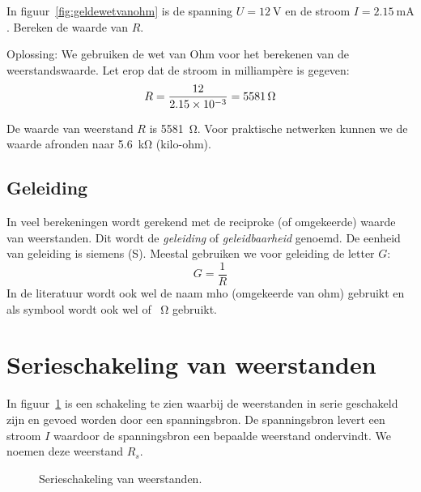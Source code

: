 \begin{example}
In figuur~\ref{fig:geldewetvanohm} is de spanning $U=\SI{12}{\volt}$ en de stroom $I=\SI{2.15}{\milli\ampere}$.
Bereken de waarde van $R$.

Oplossing: We gebruiken de wet van Ohm voor het berekenen van de weerstandswaarde. Let erop dat de stroom in milliampère is gegeven:
\begin{equation}
R = \dfrac{12}{\num{2.15d-3}} = \SI{5581}{\ohm} 
\end{equation}

De waarde van weerstand $R$ is \SI{5581}{\ohm}. Voor praktische netwerken kunnen we de waarde afronden
naar \SI{5.6}{\kilo\ohm} (kilo-ohm).
\end{example}

\subsection{Geleiding}
In veel berekeningen wordt gerekend met de reciproke (of omgekeerde) waarde van weerstanden. Dit wordt
de \textsl{geleiding} of \textsl{geleidbaarheid} genoemd. De eenheid van geleiding is siemens (\si{\siemens}).
Meestal gebruiken we voor geleiding de letter $G$:
\begin{equation}
\label{equ:geleiding}
G = \dfrac{1}{R}
\end{equation}
In de literatuur wordt ook wel de naam mho (omgekeerde van ohm) gebruikt en als symbool wordt ook wel \si{\mho} of \si{\per\ohm} gebruikt.


\section{Serieschakeling van weerstanden}
In figuur~\ref{fig:gelserieschakelingweerstanden} is een schakeling te zien waarbij de weerstanden
in serie geschakeld zijn en gevoed worden door een spanningsbron. De spanningsbron levert een stroom
$I$ waardoor de spanningsbron een bepaalde weerstand ondervindt. We noemen deze weerstand $R_s$.

\begin{figure}[!ht]
\centering
{}
\caption{Serieschakeling van weerstanden.}
\label{fig:gelserieschakelingweerstanden}
\end{figure}

